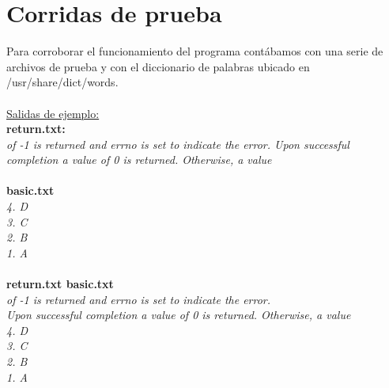 \documentclass[a4paper,11pt]{article}
\begin{document}
\section{Corridas de prueba}
Para corroborar el funcionamiento del programa cont\'abamos con una serie de archivos de prueba y con el diccionario de palabras ubicado en /usr/share/dict/words. 
\\
\\
\underline{Salidas de ejemplo:}\\
\textbf{return.txt:}\\
\emph{of -1 is returned and errno is set to indicate the error.
Upon successful completion a value of 0 is returned. Otherwise, a value}
\\\\
\textbf{basic.txt}\\
\emph{4. D\\
3. C\\
2. B\\
1. A\\}\\
\textbf{return.txt basic.txt}\\
\emph{of -1 is returned and errno is set to indicate the error.\\
Upon successful completion a value of 0 is returned. Otherwise, a value\\
4. D\\
3. C\\
2. B\\
1. A}\\
\end{document}
